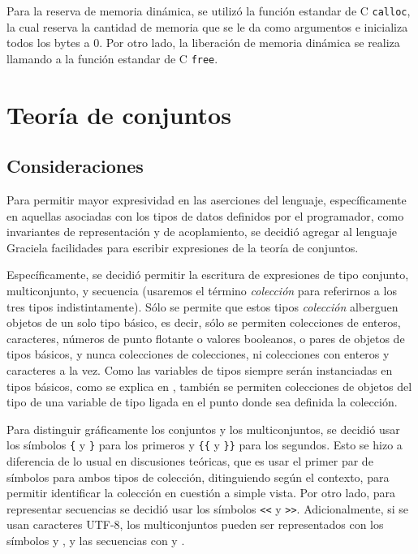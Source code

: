Para la reserva de memoria dinámica, se utilizó la función estandar de C
\texttt{calloc}, la cual reserva la cantidad de memoria que se le da como
argumentos e inicializa todos los bytes a 0. Por otro lado, la liberación de
memoria dinámica se realiza llamando a la función estandar de C \texttt{free}.

\section{Teoría de conjuntos}
\subsection{Consideraciones}

Para permitir mayor expresividad en las aserciones del lenguaje, específicamente
en aquellas asociadas con los tipos de datos definidos por el programador, como
invariantes de representación y de acoplamiento, se decidió agregar al lenguaje
Graciela facilidades para escribir expresiones de la teoría de conjuntos.

Específicamente, se decidió permitir la escritura de expresiones de tipo
conjunto, multiconjunto, y secuencia (usaremos el término \textit{colección}
para referirnos a los tres tipos indistintamente). Sólo se permite que estos
tipos \textit{colección} alberguen objetos de un solo tipo básico, es decir,
sólo se permiten colecciones de enteros, caracteres, números de punto flotante o
valores booleanos, o pares de objetos de tipos básicos, y nunca colecciones de
colecciones, ni colecciones con enteros y caracteres a la vez. Como las
variables de tipos siempre serán instanciadas en tipos básicos, como se explica
en , también se permiten colecciones de
objetos del tipo de una variable de tipo ligada en el punto donde sea definida
la colección.

Para distinguir gráficamente los conjuntos y los multiconjuntos, se decidió usar
los símbolos \texttt{\{} y \texttt{\}} para los primeros y \texttt{\{\{} y
\texttt{\}\}} para los segundos. Esto se hizo a diferencia de lo usual en
discusiones teóricas, que es usar el primer par de símbolos para ambos tipos de
colección, ditinguiendo según el contexto, para permitir identificar la
colección en cuestión a simple vista. Por otro lado, para representar secuencias
se decidió usar los símbolos \texttt{<\null<} y \texttt{>\null>}.
Adicionalmente, si se usan caracteres UTF-8, los multiconjuntos pueden ser
representados con los símbolos \texttt{\Lbag} y \texttt{\Rbag}, y las secuencias
con \texttt{\Lseq} y \texttt{\Rseq}.

